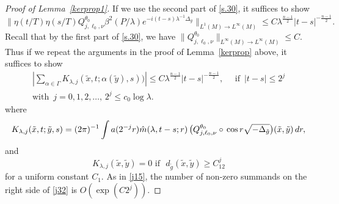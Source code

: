 \documentclass[10pt]{amsart}
\newcommand{\la}{\lambda}
\newcommand{\1}{{\bf 1}}
\begin{document}
\begin{proof}[Proof of Lemma~\ref{kerprop1}]
If we use the second part of \eqref{s.30}, it suffices to show 
\begin{equation}\label{j31}
\|\eta( t/T)\eta(s/T)Q^{\theta_0}_{j,\ell_0,\nu} \beta^2(P/\la)e^{-i(t-s)\la^{-1}\Delta_g}\|_{L^1(M)\to L^\infty(M)}\le C\la^{\frac{n-1}2}|t-s|^{-\frac{n-1}2}.
\end{equation}
Recall that by the first part of \eqref{s.30}, we have $\|Q^{\theta_0}_{j,\ell_0,\nu}\|_{L^\infty(M)\to L^\infty(M)}\le C$. Thus if we repeat the arguments in the proof of Lemma~\ref{kerprop} above, it suffices to show 
\begin{multline}\label{j32}
|\sum_{\alpha \in \Gamma}
K_{\la,j} (\tilde x,t; \alpha(\tilde y),s))|\le C\la^{\frac{n-1}2}|t-s|^{-\tfrac{n-1}2}, \, \,  \quad \text{if } \, |t-s|\le 2^j \\ \text{with}\,\,\,j=0,1,2,\dots, \, 2^j\le  c_0\log\la.
\end{multline}
where 
\begin{equation}\label{j33}
K_{\la,j}(\tilde x,t;\tilde y,s)=
(2\pi)^{-1}\int a(2^{-j}r)\Hat m(\la,t-s;r)\,\big(Q^{\theta_0}_{j,\ell_0,\nu} \circ
\,  \cos r\sqrt{-\Delta_{\tilde g}}\big)(\tilde x,
\tilde y) \, dr,
\end{equation}
and
\begin{equation}\label{j34}
 K_{\la,j}(\tilde x,\tilde y)=0 \, \, \text{if } \, \, 
d_{\tilde g}(\tilde x,\tilde y)\ge C_12^j
\end{equation}
for a uniform constant $C_1$.  As in \eqref{j15},
 the number
of non-zero summands on the right side of \eqref{j32} is $O(\exp(C2^j))$. 



\end{proof}
\end{document}
